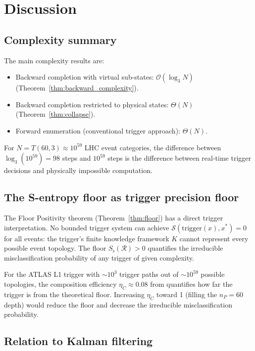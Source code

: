 \documentclass[twocolumn,10pt,a4paper]{article}
\theoremstyle{thmstyle}
\theoremstyle{definition}
\theoremstyle{remark}
\newcommand{\Sfl}{S_{\flat}}
\newcommand{\receiver}{\mathcal{R}}
\newcommand{\etaC}{\eta_{C}}
\begin{document}
\section{Discussion}
\label{sec:discussion}

\subsection{Complexity summary}

The main complexity results are:
\begin{itemize}[nosep]
\item Backward completion with virtual sub-states: $\mathcal{O}(\log_3 N)$
(Theorem~\ref{thm:backward_complexity}).
\item Backward completion restricted to physical states: $\Theta(N)$
(Theorem~\ref{thm:collapse}).
\item Forward enumeration (conventional trigger approach): $\Theta(N)$.
\end{itemize}
For $N = T(60,3) \approx 10^{59}$ LHC event categories, the difference
between $\log_3(10^{59}) = 98$ steps and $10^{59}$ steps is the difference
between real-time trigger decisions and physically impossible computation.

\subsection{The S-entropy floor as trigger precision floor}

The Floor Positivity theorem (Theorem~\ref{thm:floor}) has a direct trigger
interpretation. No bounded trigger system can achieve $\mathcal{S}(\text{trigger}(x), x^*) = 0$
for all events: the trigger's finite knowledge framework $K$ cannot represent
every possible event topology. The floor $\Sfl(\receiver) > 0$ quantifies
the irreducible misclassification probability of any trigger of given complexity.

For the ATLAS L1 trigger with $\sim 10^3$ trigger paths out of $\sim 10^{59}$
possible topologies, the composition efficiency $\etaC \approx 0.08$ from
\citet{companion:planck} quantifies how far the trigger is from the theoretical
floor. Increasing $\etaC$ toward 1 (filling the $n_P = 60$ depth) would
reduce the floor and decrease the irreducible misclassification probability.

\subsection{Relation to Kalman filtering}
\end{document}

